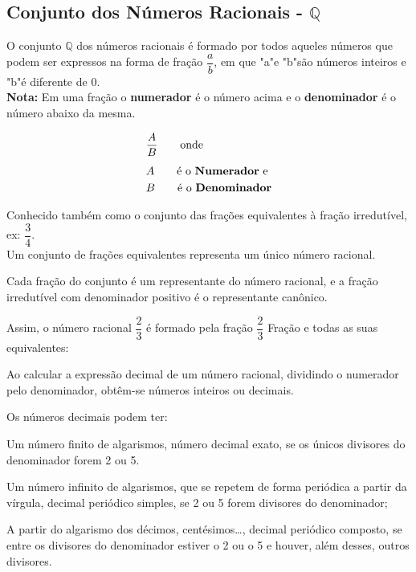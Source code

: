 \begin{multicols*}{2}
\begin{enumerate}
	\end{enumerate}

	\subsection*{Conjunto dos Números Racionais - $\mathbb{Q}$}

	O conjunto $\mathbb{Q} $ dos números racionais é formado por todos aqueles números que podem ser expressos na forma de fração $\dfrac{a}{b}$, em que "a"e "b"são números inteiros e "b"é diferente de 0.\\

	\textbf{Nota:} Em uma fração o \textbf{ numerador} é o número acima e o \textbf{denominador} é o número abaixo da mesma.

	\begin{align*}
		 & \frac{A}{B} \qquad\text{onde}             \\[1ex]
		 & A \qquad \text{é o \textbf{Numerador} e } \\
		 & B \qquad \text{é o \textbf{Denominador}}
	\end{align*}

	Conhecido também como o conjunto das frações equivalentes à fração irredutível, ex: $\dfrac{3}{4}$.\\

	Um conjunto de frações equivalentes representa um único número racional.

	Cada fração do conjunto é um representante do número racional, e a fração irredutível com denominador positivo é o representante canônico.

	Assim, o número racional $\dfrac{2}{3} $ é formado pela fração $\dfrac{2}{3}$ Fração e todas as suas equivalentes:

	Ao calcular a expressão decimal de um número racional, dividindo o numerador pelo denominador, obtêm-se números inteiros ou decimais.

	Os números decimais podem ter:

	Um número finito de algarismos, número decimal exato, se os únicos divisores do denominador forem 2 ou 5.

	Um número infinito de algarismos, que se repetem de forma periódica a partir da vírgula, decimal periódico simples, se 2 ou 5 forem divisores do denominador;

	A partir do algarismo dos décimos, centésimos…, decimal periódico composto, se entre os divisores do denominador estiver o 2 ou o 5 e houver, além desses, outros divisores.


\end{multicols*}
